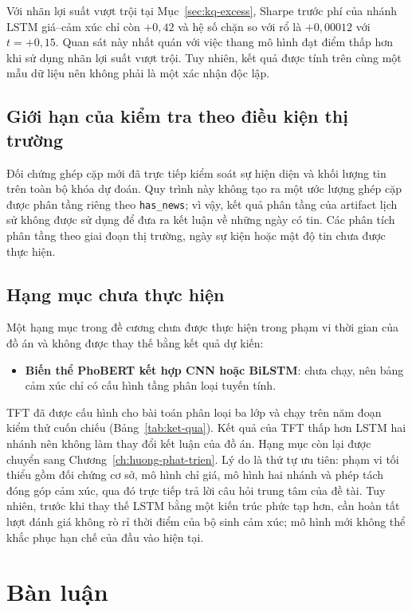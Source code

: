 \documentclass[12pt, a4paper, oneside]{report}
\begin{document}
Với nhãn lợi suất vượt trội tại Mục~\ref{sec:kq-excess}, Sharpe trước phí của nhánh LSTM giá--cảm xúc chỉ còn $+0{,}42$ và hệ số chặn so với rổ là $+0{,}00012$ với $t = +0{,}15$. Quan sát này nhất quán với việc thang mô hình đạt điểm thấp hơn khi sử dụng nhãn lợi suất vượt trội. Tuy nhiên, kết quả được tính trên cùng một mẫu dữ liệu nên không phải là một xác nhận độc lập.


\subsection{Giới hạn của kiểm tra theo điều kiện thị trường}
\label{sec:kq-strat}

Đối chứng ghép cặp mới đã trực tiếp kiểm soát sự hiện diện và khối lượng tin trên toàn bộ khóa dự đoán. Quy trình này không tạo ra một ước lượng ghép cặp được phân tầng riêng theo \texttt{has\_news}; vì vậy, kết quả phân tầng của artifact lịch sử không được sử dụng để đưa ra kết luận về những ngày có tin. Các phân tích phân tầng theo giai đoạn thị trường, ngày sự kiện hoặc mật độ tin chưa được thực hiện.

\subsection{Hạng mục chưa thực hiện}

Một hạng mục trong đề cương chưa được thực hiện trong phạm vi thời gian của đồ án và không được thay thế bằng kết quả dự kiến:

\begin{itemize}[nosep]
  \item \textbf{Biến thể PhoBERT kết hợp CNN hoặc BiLSTM}: chưa chạy, nên bảng cảm xúc chỉ
        có cấu hình tầng phân loại tuyến tính.
\end{itemize}

TFT đã được cấu hình cho bài toán phân loại ba lớp và chạy trên năm đoạn kiểm thử cuốn chiếu (Bảng~\ref{tab:ket-qua}). Kết quả của TFT thấp hơn LSTM hai nhánh nên không làm thay đổi kết luận của đồ án. Hạng mục còn lại được chuyển sang Chương~\ref{ch:huong-phat-trien}. Lý do là thứ tự ưu tiên: phạm vi tối thiểu gồm đối chứng cơ sở, mô hình chỉ giá, mô hình hai nhánh và phép tách đóng góp cảm xúc, qua đó trực tiếp trả lời câu hỏi trung tâm của đề tài. Tuy nhiên, trước khi thay thế LSTM bằng một kiến trúc phức tạp hơn, cần hoàn tất lượt đánh giá không rò rỉ thời điểm của bộ sinh cảm xúc; mô hình mới không thể khắc phục hạn chế của đầu vào hiện tại.

\section{Bàn luận}
\label{sec:kq-ban-luan}
\end{document}
